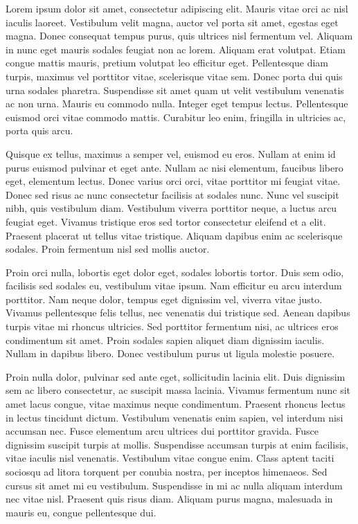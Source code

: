 \documentclass[a4paper,12pt]{article}
\begin{document}
	Lorem ipsum dolor sit amet, consectetur adipiscing elit. Mauris vitae orci ac nisl iaculis laoreet. Vestibulum velit magna, auctor vel porta sit amet, egestas eget magna. Donec consequat tempus purus, quis ultrices nisl fermentum vel. Aliquam in nunc eget mauris sodales feugiat non ac lorem. Aliquam erat volutpat. Etiam congue mattis mauris, pretium volutpat leo efficitur eget. Pellentesque diam turpis, maximus vel porttitor vitae, scelerisque vitae sem. Donec porta dui quis urna sodales pharetra. Suspendisse sit amet quam ut velit vestibulum venenatis ac non urna. Mauris eu commodo nulla. Integer eget tempus lectus. Pellentesque euismod orci vitae commodo mattis. Curabitur leo enim, fringilla in ultricies ac, porta quis arcu.
	
	Quisque ex tellus, maximus a semper vel, euismod eu eros. Nullam at enim id purus euismod pulvinar et eget ante. Nullam ac nisi elementum, faucibus libero eget, elementum lectus. Donec varius orci orci, vitae porttitor mi feugiat vitae. Donec sed risus ac nunc consectetur facilisis at sodales nunc. Nunc vel suscipit nibh, quis vestibulum diam. Vestibulum viverra porttitor neque, a luctus arcu feugiat eget. Vivamus tristique eros sed tortor consectetur eleifend et a elit. Praesent placerat ut tellus vitae tristique. Aliquam dapibus enim ac scelerisque sodales. Proin fermentum nisl sed mollis auctor.
	
	Proin orci nulla, lobortis eget dolor eget, sodales lobortis tortor. Duis sem odio, facilisis sed sodales eu, vestibulum vitae ipsum. Nam efficitur eu arcu interdum porttitor. Nam neque dolor, tempus eget dignissim vel, viverra vitae justo. Vivamus pellentesque felis tellus, nec venenatis dui tristique sed. Aenean dapibus turpis vitae mi rhoncus ultricies. Sed porttitor fermentum nisi, ac ultrices eros condimentum sit amet. Proin sodales sapien aliquet diam dignissim iaculis. Nullam in dapibus libero. Donec vestibulum purus ut ligula molestie posuere.
	
	Proin nulla dolor, pulvinar sed ante eget, sollicitudin lacinia elit. Duis dignissim sem ac libero consectetur, ac suscipit massa lacinia. Vivamus fermentum nunc sit amet lacus congue, vitae maximus neque condimentum. Praesent rhoncus lectus in lectus tincidunt dictum. Vestibulum venenatis enim sapien, vel interdum nisi accumsan nec. Fusce elementum arcu ultrices dui porttitor gravida. Fusce dignissim suscipit turpis at mollis. Suspendisse accumsan turpis at enim facilisis, vitae iaculis nisl venenatis. Vestibulum vitae congue enim. Class aptent taciti sociosqu ad litora torquent per conubia nostra, per inceptos himenaeos. Sed cursus sit amet mi eu vestibulum. Suspendisse in mi ac nulla aliquam interdum nec vitae nisl. Praesent quis risus diam. Aliquam purus magna, malesuada in mauris eu, congue pellentesque dui.
	
\end{document}

